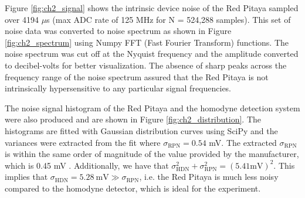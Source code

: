 Figure \ref{fig:ch2_signal} shows the intrinsic device noise of the Red Pitaya sampled over 4194 $\mu$s (max ADC rate of 125 MHz for N = 524,288 samples). This set of noise data was converted to noise spectrum as shown in Figure \ref{fig:ch2_spectrum} using Numpy FFT (Fast Fourier Transform) functions. The noise spectrum was cut off at the Nyquist frequency and the amplitude converted to decibel-volts for better visualization. The absence of sharp peaks across the frequency range of the noise spectrum assured that the Red Pitaya is not intrinsically hypersensitive to any particular signal frequencies.

The noise signal histogram of the Red Pitaya and the homodyne detection system were also produced and are shown in Figure \ref{fig:ch2_distribution}. The histograms are fitted with Gaussian distribution curves using SciPy and the variances were extracted from the fit where $\sigma_\text{RPN} = 0.54$ mV. The extracted $\sigma_\text{RPN}$ is within the same order of magnitude of the value provided by the manufacturer, which is 0.45 mV \cite{rp}. Additionally, we have that $\sigma^2_\text{HDN} + \sigma^2_\text{RPN} = (5.41 \text{mV})^2$. This implies that $\sigma_\text{HDN} = 5.28\ \text{mV} \gg \sigma_\text{RPN}$, i.e. the Red Pitaya is much less noisy compared to the homodyne detector, which is ideal for the experiment.

